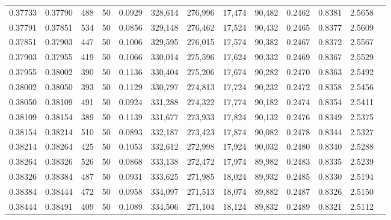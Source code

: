 \begin{tabular}{rrrrrrrrrrrrr}
0.37733 & 0.37790 &   488 &  50 &                                     0.0929 & 328,614 & 276,996 &  17,474 &  90,482 & 0.2462 & 0.8381 & 2.5658 \\
0.37791 & 0.37851 &   534 &  50 &                                     0.0856 & 329,148 & 276,462 &  17,524 &  90,432 & 0.2465 & 0.8377 & 2.5609 \\
0.37851 & 0.37903 &   447 &  50 &                                     0.1006 & 329,595 & 276,015 &  17,574 &  90,382 & 0.2467 & 0.8372 & 2.5567 \\
0.37903 & 0.37955 &   419 &  50 &                                     0.1066 & 330,014 & 275,596 &  17,624 &  90,332 & 0.2469 & 0.8367 & 2.5529 \\
0.37955 & 0.38002 &   390 &  50 &                                     0.1136 & 330,404 & 275,206 &  17,674 &  90,282 & 0.2470 & 0.8363 & 2.5492 \\
0.38002 & 0.38050 &   393 &  50 &                                     0.1129 & 330,797 & 274,813 &  17,724 &  90,232 & 0.2472 & 0.8358 & 2.5456 \\
0.38050 & 0.38109 &   491 &  50 &                                     0.0924 & 331,288 & 274,322 &  17,774 &  90,182 & 0.2474 & 0.8354 & 2.5411 \\
0.38109 & 0.38154 &   389 &  50 &                                     0.1139 & 331,677 & 273,933 &  17,824 &  90,132 & 0.2476 & 0.8349 & 2.5375 \\
0.38154 & 0.38214 &   510 &  50 &                                     0.0893 & 332,187 & 273,423 &  17,874 &  90,082 & 0.2478 & 0.8344 & 2.5327 \\
0.38214 & 0.38264 &   425 &  50 &                                     0.1053 & 332,612 & 272,998 &  17,924 &  90,032 & 0.2480 & 0.8340 & 2.5288 \\
0.38264 & 0.38326 &   526 &  50 &                                     0.0868 & 333,138 & 272,472 &  17,974 &  89,982 & 0.2483 & 0.8335 & 2.5239 \\
0.38326 & 0.38384 &   487 &  50 &                                     0.0931 & 333,625 & 271,985 &  18,024 &  89,932 & 0.2485 & 0.8330 & 2.5194 \\
0.38384 & 0.38444 &   472 &  50 &                                     0.0958 & 334,097 & 271,513 &  18,074 &  89,882 & 0.2487 & 0.8326 & 2.5150 \\
0.38444 & 0.38491 &   409 &  50 &                                     0.1089 & 334,506 & 271,104 &  18,124 &  89,832 & 0.2489 & 0.8321 & 2.5112 \\

\end{tabular}
